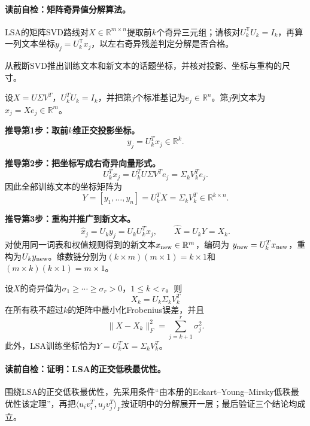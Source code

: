 \paragraph{读前自检：矩阵奇异值分解算法。}LSA的矩阵SVD路线对$X\in\mathbb R^{m\times n}$提取前$k$个奇异三元组；请核对$U_k^{\mathsf T}U_k=I_k$，再算一列文本坐标$y_j=U_k^{\mathsf T}x_j$，以左右奇异残差判定分解是否合格。\par


\label{struct:V4-C05-CH11}
\begin{derivationgoalbox}
从截断SVD推出训练文本和新文本的话题坐标，并核对投影、坐标与重构的尺寸。
\end{derivationgoalbox}
\begin{derivationprepbox}
设$X=U\Sigma V^T$，$U_k^TU_k=I_k$，并把第$j$个标准基记为$e_j\in\mathbb R^n$。第$j$列文本为$x_j=Xe_j\in\mathbb R^m$。
\end{derivationprepbox}

\textbf{推导第1步：取前$k$维正交投影坐标。}
\[
y_j=U_k^Tx_j\in\mathbb R^k.
\]

\textbf{推导第2步：把坐标写成右奇异向量形式。}
\[
U_k^Tx_j
=U_k^TU\Sigma V^Te_j
=\Sigma_kV_k^Te_j.
\]
因此全部训练文本的坐标矩阵为
\[
Y=[y_1,\ldots,y_n]=U_k^TX=\Sigma_kV_k^T\in\mathbb R^{k\times n}.
\]

\textbf{推导第3步：重构并推广到新文本。}
\[
\widehat x_j=U_ky_j=U_kU_k^Tx_j,
\qquad
\widehat X=U_kY=X_k.
\]
对使用同一词表和权值规则得到的新文本$x_{\rm new}\in\mathbb R^m$，编码为
$y_{\rm new}=U_k^Tx_{\rm new}$，重构为$U_ky_{\rm new}$。维数链分别为$(k\times m)(m\times1)=k\times1$和$(m\times k)(k\times1)=m\times1$。

\label{struct:V4-C05-CH12}
\begin{theorem}[LSA的正交低秩最优性]\label{thm:V4-C05-lsa-optimal}
设$X$的奇异值为$\sigma_1\ge\cdots\ge\sigma_r>0$，$1\le k<r$。则
\[
X_k=U_k\Sigma_kV_k^T
\]
在所有秩不超过$k$的矩阵中最小化Frobenius误差，并且
\[
\|X-X_k\|_F^2=\sum_{j=k+1}^{r}\sigma_j^2.
\]
此外，LSA训练坐标恰为$Y=U_k^TX=\Sigma_kV_k^T$。
\end{theorem}

\label{struct:V4-C05-CH13}
\paragraph{读前自检：证明：LSA的正交低秩最优性。}围绕LSA的正交低秩最优性，先采用条件“由本册的Eckart--Young--Mirsky低秩最优性该定理”，再把$\langle u_iv_i^T,u_jv_j^T\rangle_F$按证明中的分解展开一层；最后验证三个结论均成立。\par

